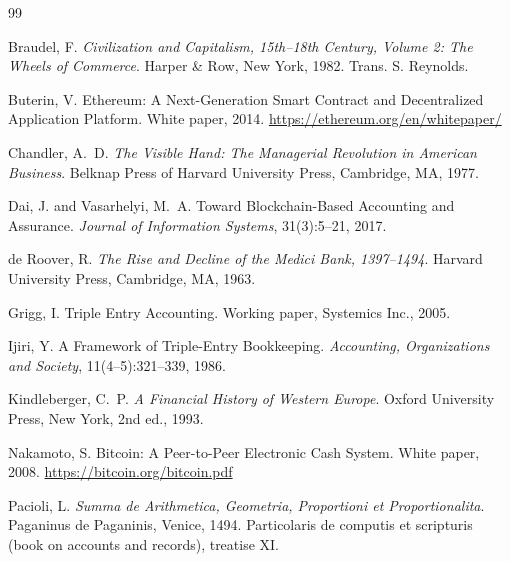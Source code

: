 \documentclass[11pt,a4paper]{article}
\theoremstyle{definition}
\theoremstyle{remark}
\begin{document}

\begin{thebibliography}{99}

Braudel, F.
\newblock \emph{Civilization and Capitalism, 15th--18th Century,
  Volume 2: The Wheels of Commerce}.
\newblock Harper \& Row, New York, 1982.
\newblock Trans. S. Reynolds.

Buterin, V.
\newblock Ethereum: A Next-Generation Smart Contract and
  Decentralized Application Platform.
\newblock White paper, 2014.
\newblock \url{https://ethereum.org/en/whitepaper/}

Chandler, A.~D.
\newblock \emph{The Visible Hand: The Managerial Revolution
  in American Business}.
\newblock Belknap Press of Harvard University Press,
  Cambridge, MA, 1977.

Dai, J. and Vasarhelyi, M.~A.
\newblock Toward Blockchain-Based Accounting and Assurance.
\newblock \emph{Journal of Information Systems},
  31(3):5--21, 2017.

de Roover, R.
\newblock \emph{The Rise and Decline of the Medici Bank,
  1397--1494}.
\newblock Harvard University Press, Cambridge, MA, 1963.

Grigg, I.
\newblock Triple Entry Accounting.
\newblock Working paper, Systemics Inc., 2005.

Ijiri, Y.
\newblock A Framework of Triple-Entry Bookkeeping.
\newblock \emph{Accounting, Organizations and Society},
  11(4--5):321--339, 1986.

Kindleberger, C.~P.
\newblock \emph{A Financial History of Western Europe}.
\newblock Oxford University Press, New York, 2nd ed., 1993.

Nakamoto, S.
\newblock Bitcoin: A Peer-to-Peer Electronic Cash System.
\newblock White paper, 2008.
\newblock \url{https://bitcoin.org/bitcoin.pdf}

Pacioli, L.
\newblock \emph{Summa de Arithmetica, Geometria,
  Proportioni et Proportionalita}.
\newblock Paganinus de Paganinis, Venice, 1494.
\newblock Particolaris de computis et scripturis (book on
  accounts and records), treatise XI.


\end{thebibliography}
\end{document}
